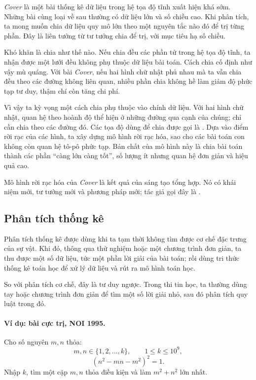\documentclass[11pt]{article}
\begin{document}
\textit{Cover} là một bài thống kê dữ liệu trong hệ tọa độ tĩnh xuất hiện khá
sớm. Những bài cùng loại về sau thường có dữ liệu lớn và số chiều cao. Khi
phân tích, ta mong muốn chia dữ liệu quy mô lớn theo một nguyên tắc nào đó để
trị từng phần. Đây là liên tưởng từ tư tưởng chia để trị, với mục tiêu hạ số
chiều.

Khó khăn là chia như thế nào. Nếu chia đều các phần tử trong hệ tọa độ tĩnh,
ta nhận được một lưới đều không phụ thuộc dữ liệu bài toán. Cách chia cố định
như vậy mù quáng. Với bài \textit{Cover}, nếu hai hình chữ nhật phủ nhau mà ta
vẫn chia đều theo các đường không liên quan, nhiều phần chia không hề làm giảm
độ phức tạp tư duy, thậm chí còn tăng chi phí.

Vì vậy ta kỳ vọng một cách chia phụ thuộc vào chính dữ liệu. Với hai hình chữ
nhật, quan hệ theo hoành độ thể hiện ở những đường qua cạnh của chúng; chỉ cần
chia theo các đường đó. Các tọa độ dùng để chia được gọi là . Dựa vào điểm rời rạc của các hình, ta xây dựng mô hình rời rạc hóa, sao
cho các bài toán con không còn quan hệ tô-pô phức tạp. Bản chất của mô hình
này là chia bài toán thành các phần ``càng lớn càng tốt'', số lượng ít nhưng
quan hệ đơn giản và hiệu quả cao.

Mô hình rời rạc hóa của \textit{Cover} là kết quả của sáng tạo tổng hợp. Nó có
khái niệm mới, tư tưởng mới và phương pháp mới; tác giả gọi đây là
.

\subsection{Phân tích thống kê}

Phân tích thống kê được dùng khi ta tạm thời không tìm được cơ chế đặc trưng
của sự vật. Khi đó, thông qua thử nghiệm hoặc một chương trình đơn giản, ta
thu được một số dữ liệu, tức một phần lời giải của bài toán; rồi dùng tri thức
thống kê toán học để xử lý dữ liệu và rút ra mô hình toán học.

So với phân tích cơ chế, đây là tư duy ngược. Trong thi tin học, ta thường
dùng tay hoặc chương trình đơn giản để tìm một số lời giải nhỏ, sau đó phân
tích quy luật trong đó.

\paragraph{Ví dụ: bài cực trị, NOI 1995.}
Cho số nguyên \(m,n\) thỏa:
\[
  m,n\in\{1,2,\ldots,k\},\qquad 1\le k\le 10^9,
\]
\[
  (n^2-mn-m^2)^2=1.
\]
Nhập \(k\), tìm một cặp \(m,n\) thỏa điều kiện và làm \(m^2+n^2\) lớn nhất.
\end{document}
